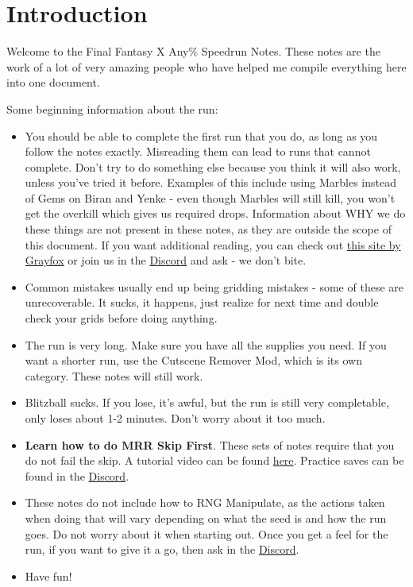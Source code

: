 \chapter{Introduction}

Welcome to the Final Fantasy X Any\% Speedrun Notes. These notes are the work of a lot of very amazing people who have helped me compile everything here into one document.

Some beginning information about the run:

\begin{itemize}
    \item You should be able to complete the first run that you do, as long as you follow the notes exactly. Misreading them can lead to runs that cannot complete. Don't try to do something else because you think it will also work, unless you've tried it before. Examples of this include using Marbles instead of Gems on Biran and Yenke - even though Marbles will still kill, you won't get the overkill which gives us required drops. Information about WHY we do these things are not present in these notes, as they are outside the scope of this document. If you want additional reading, you can check out \href{https://grayfox96.github.io/FFX-Info/}{this site by Grayfox} or join us in the \href{https://discord.gg/X3qXHWG}{Discord} and ask - we don't bite.
    \item Common mistakes usually end up being gridding mistakes - some of these are unrecoverable. It sucks, it happens, just realize for next time and double check your grids before doing anything.
    \item The run is very long. Make sure you have all the supplies you need. If you want a shorter run, use the Cutscene Remover Mod, which is its own category. These notes will still work.
    \item Blitzball sucks. If you lose, it's awful, but the run is still very completable, only loses about 1-2 minutes. Don't worry about it too much.
    \item \textbf{Learn how to do MRR Skip First}. These sets of notes require that you do not fail the skip. A tutorial video can be found \href{https://www.youtube.com/watch?v=SSnxE6Xzvkk}{here}. Practice saves can be found in the \href{https://discord.gg/X3qXHWG}{Discord}.
    \item These notes do not include how to RNG Manipulate, as the actions taken when doing that will vary depending on what the seed is and how the run goes. Do not worry about it when starting out. Once you get a feel for the run, if you want to give it a go, then ask in the \href{https://discord.gg/X3qXHWG}{Discord}.
    \item Have fun!
\end{itemize}

